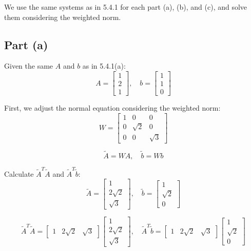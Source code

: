 \documentclass[12pt]{article}
\begin{document}
We use the same systems as in 5.4.1 for each part (a), (b), and (c), and solve them considering the weighted norm.

\subsection*{Part (a)}
Given the same \( A \) and \( b \) as in 5.4.1(a):
\[
  A = \begin{bmatrix} 1 \\ 2 \\ 1 \end{bmatrix}, \quad b = \begin{bmatrix} 1 \\ 1 \\ 0 \end{bmatrix}
\]

First, we adjust the normal equation considering the weighted norm:
\[
  W = \begin{bmatrix} 1 & 0 & 0 \\ 0 & \sqrt{2} & 0 \\ 0 & 0 & \sqrt{3} \end{bmatrix}
\]

\[
  \tilde{A} = WA, \quad \tilde{b} = Wb
\]

Calculate \( \tilde{A}^T \tilde{A} \) and \( \tilde{A}^T \tilde{b} \):
\[
  \tilde{A} = \begin{bmatrix} 1 \\ 2\sqrt{2} \\ \sqrt{3} \end{bmatrix}, \quad \tilde{b} = \begin{bmatrix} 1 \\ \sqrt{2} \\ 0 \end{bmatrix}
\]

\[
  \tilde{A}^T \tilde{A} = \begin{bmatrix} 1 & 2\sqrt{2} & \sqrt{3} \end{bmatrix} \begin{bmatrix} 1 \\ 2\sqrt{2} \\ \sqrt{3} \end{bmatrix}, \quad \tilde{A}^T \tilde{b} = \begin{bmatrix} 1 & 2\sqrt{2} & \sqrt{3} \end{bmatrix} \begin{bmatrix} 1 \\ \sqrt{2} \\ 0 \end{bmatrix}
\]
\end{document}

